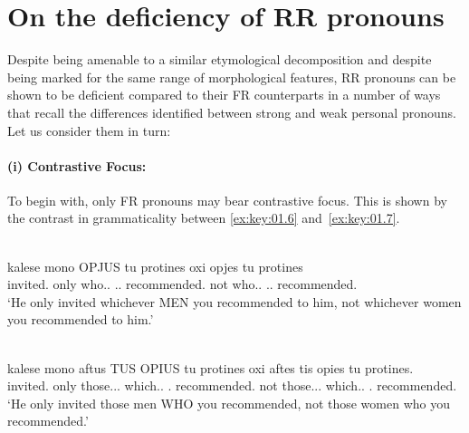 \documentclass[output=paper]{langsci/langscibook}
\begin{document}
\section{On the deficiency of RR pronouns}\label{sec:key:01.3}

Despite being amenable to a similar etymological decomposition and despite
being marked for the same range of morphological features, \gls{RR} pronouns
can be shown to be deficient compared to their \gls{FR} counterparts in a
number of ways that recall the differences identified between strong and weak
personal pronouns. Let us consider them in turn:

\paragraph*{(i) Contrastive Focus:} To begin with, only \gls{FR}
pronouns may bear contrastive
focus. This is shown by the contrast in
grammaticality between \eqref{ex:key:01.6} and~\eqref{ex:key:01.7}.

\ea {}\label{ex:key:01.6}\\
	\gll kalese mono OPJUS tu protines oxi opjes tu protines\\
		invited.\Tsg{} only who.\M{}.\Pl{} \Cl.\Tsg.\M{} recommended.\Ssg{} not who.\glossF.\Pl{} \Cl.\Tsg.\M{} recommended.\Ssg{}\\
	\glt \enquote*{He only invited whichever MEN you recommended to him, not whichever women you recommended to him.}
\z

\ea {}\label{ex:key:01.7}\\
    \gll \llap{*}kalese mono aftus {TUS OPIUS} tu protines oxi aftes {tis opies} tu protines.\\
    invited.\Tsg{} only those.\M.\Pl.\Acc{} which.\M.\Pl{} \Cl.\Tsg{}
    recommended.\Ssg{} not those.\glossF.\Pl.\Acc{} which.\glossF.\Pl{} \Cl.\Tsg{} recommended.\Ssg{}\\
    \glt *\enquote*{He only invited those men WHO you recommended, not
    those women who you recommended.}
\z
\end{document}
